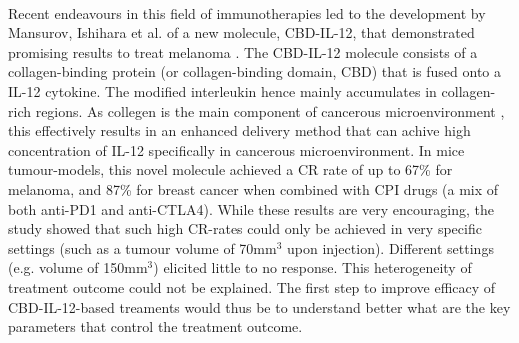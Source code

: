 \documentclass[11pt]{article}
\begin{document}
~ %
\par Recent endeavours in this field of immunotherapies led to the development by Mansurov, Ishihara et al. of a new molecule, CBD-IL-12, that demonstrated promising results to treat melanoma \cite{cbdil12}. The CBD-IL-12  molecule consists of a collagen-binding protein (or collagen-binding domain, CBD) that is fused onto a IL-12 cytokine. The modified interleukin hence mainly accumulates in collagen-rich regions. As collegen is the main component of cancerous microenvironment \cite{collagenInCancer}, this effectively results in an enhanced delivery method that can achive high concentration of IL-12 specifically in cancerous microenvironment. In mice tumour-models, this novel molecule achieved a CR rate of up to 67\% for melanoma, and 87\% for breast cancer when combined with CPI drugs (a mix of both anti-PD1 and anti-CTLA4). While these results are very encouraging, the study showed that such high CR-rates could only be achieved in very specific settings (such as a tumour volume of 70mm$^3$ upon injection). Different settings (e.g. volume of 150mm$^3$) elicited little to no response. This heterogeneity of treatment outcome could not be explained. The first step to improve efficacy of CBD-IL-12-based treaments would thus be to understand better what are the key parameters that control the treatment outcome. 
\end{document}
